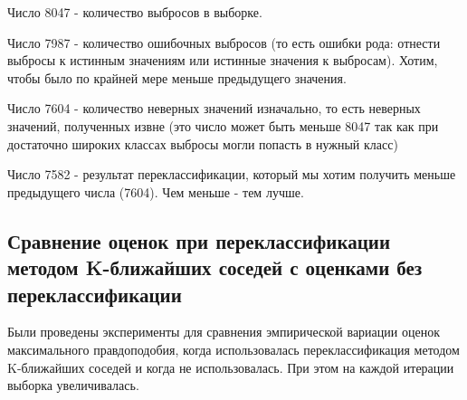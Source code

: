 Число 8047 - количество выбросов в выборке.

Число 7987 - количество ошибочных выбросов (то есть ошибки рода: отнести выбросы к истинным значениям или истинные значения к выбросам). Хотим, чтобы было по крайней мере меньше предыдущего значения.

Число 7604 - количество неверных значений изначально, то есть неверных значений, полученных извне (это число может быть меньше 8047 так как при достаточно широких классах выбросы могли попасть в нужный класс)

Число 7582 - результат переклассификации, который мы хотим получить меньше предыдущего числа (7604). Чем меньше - тем лучше.


\newpage
\subsection{Сравнение оценок при переклассификации методом K-ближайших соседей с оценками без переклассификации}
Были проведены эксперименты для сравнения эмпирической вариации оценок максимального правдоподобия, когда использовалась переклассификация методом K-ближайших соседей и когда не использовалась. При этом на каждой итерации выборка увеличивалась. 

